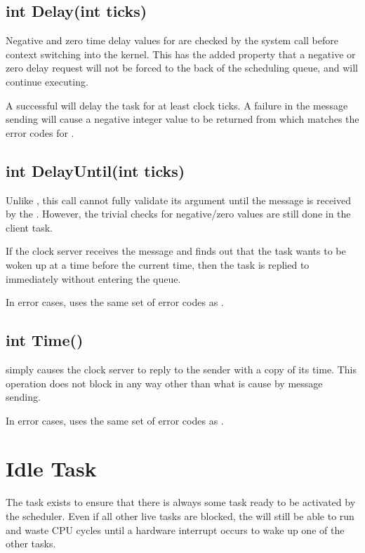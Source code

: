 \documentclass[pdftex,10pt,a4paper]{article}
\begin{document}
\subsection*{int Delay(int ticks)}

Negative and zero time delay values for  are checked by the
system call before context switching into the kernel. This has the
added property that a negative or zero delay request will not be
forced to the back of the scheduling queue, and will continue
executing.

A successful  will delay the task for at least 
clock ticks. A failure in the message sending will cause a negative
integer value to be returned from  which matches the error
codes for .

\subsection*{int DelayUntil(int ticks)}

Unlike , this call cannot fully validate its argument until
the message is received by the . However, the
trivial checks for negative/zero values are still done in the client
task.

If the clock server receives the message and finds out that the task
wants to be woken up at a time before the current time, then the task
is replied to immediately without entering the queue.

In error cases,  uses the same set of error codes as
.

\subsection*{int Time()}

 simply causes the clock server to reply to the sender with
a copy of its time. This operation does not block in any way other
than what is cause by message sending.

In error cases,  uses the same set of error codes as
.


\section*{Idle Task}

The  task exists to ensure that there is always some task
ready to be activated by the scheduler. Even if all other live tasks
are blocked, the  will still be able to run and waste CPU
cycles until a hardware interrupt occurs to wake up one of the other
tasks.
\end{document}
